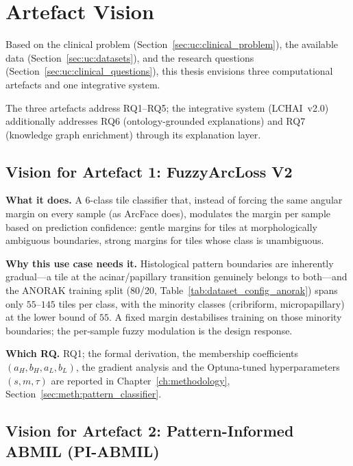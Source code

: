 \section{Artefact Vision}
\label{sec:uc:artifact_vision}

Based on the clinical problem (Section~\ref{sec:uc:clinical_problem}),
the available data (Section~\ref{sec:uc:datasets}), and the research
questions (Section~\ref{sec:uc:clinical_questions}), this thesis
envisions three computational artefacts and one integrative system.

The three artefacts address RQ1--RQ5; the integrative system
(LCHAI~v2.0) additionally addresses RQ6 (ontology-grounded explanations)
and RQ7 (knowledge graph enrichment) through its explanation layer.

\subsection{Vision for Artefact 1: FuzzyArcLoss V2}
\label{sec:uc:artifact1}

\textbf{What it does.}
A 6-class tile classifier that, instead of forcing the same angular
margin on every sample (as ArcFace does), modulates the margin per
sample based on prediction confidence: gentle margins for tiles at
morphologically ambiguous boundaries, strong margins for tiles whose
class is unambiguous.

\textbf{Why this use case needs it.}
Histological pattern boundaries are inherently gradual---a tile at the
acinar/papillary transition genuinely belongs to both---and the
ANORAK training split (80/20, Table~\ref{tab:dataset_config_anorak})
spans only $55$--$145$ tiles per class, with the minority classes
(cribriform, micropapillary) at the lower bound of $55$.
A fixed margin destabilises training on those minority boundaries;
the per-sample fuzzy modulation is the design response.

\textbf{Which RQ.}
RQ1; the formal derivation, the membership coefficients
$(a_H, b_H, a_L, b_L)$, the gradient analysis and the Optuna-tuned
hyperparameters $(s, m, \tau)$ are reported in
Chapter~\ref{ch:methodology},
Section~\ref{sec:meth:pattern_classifier}.


\subsection{Vision for Artefact 2: Pattern-Informed ABMIL (PI-ABMIL)}
\label{sec:uc:artifact2}

